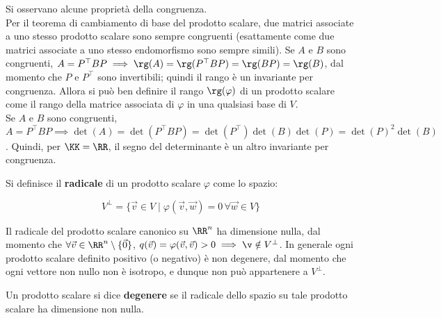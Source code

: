 \documentclass[11pt]{article}
\begin{document}
	\begin{remark}
		Si osservano alcune proprietà della congruenza. \\
		
		\li Per il teorema di cambiamento di base del prodotto scalare, due matrici associate a uno stesso
		prodotto scalare sono sempre congruenti (esattamente come due matrici associate a uno stesso
		endomorfismo sono sempre simili).
		\li Se $A$ e $B$ sono congruenti, $A = P^\top B P \implies \rg(A) = \rg(P^\top B P) = \rg(BP) = \rg(B)$,
		dal momento che $P$ e $P^\top$ sono invertibili; quindi il rango è un invariante per congruenza. Allora
		si può ben definire il rango $\rg(\varphi)$ di un prodotto scalare come il rango della matrice
		associata di $\varphi$ in una qualsiasi base di $V$. \\
		\li Se $A$ e $B$ sono congruenti, $A = P^\top B P \implies \det(A) = \det(P^\top B P) = \det(P^\top) \det(B) \det(P)=
		\det(P)^2 \det(B)$. Quindi, per $\KK = \RR$, il segno del determinante è un altro invariante per congruenza.
	\end{remark}

	\begin{definition}
		Si definisce il \textbf{radicale} di un prodotto scalare $\varphi$ come lo spazio:
		
		\[ V^\perp = \{ \vec{v} \in V \mid \varphi(\vec{v}, \vec{w}) = 0 \, \forall \vec{w} \in V \} \]
		
		\vskip 0.05in
	\end{definition}
	
	\begin{remark}
		Il radicale del prodotto scalare canonico su $\RR^n$ ha dimensione nulla, dal momento che $\forall \vec{v} \in \RR^n \setminus \{\vec{0}\}$, $q(\vec{v}) = \varphi(\vec{v}, \vec{v}) > 0 \implies \v \notin V^\perp$. In
		generale ogni prodotto scalare definito positivo (o negativo) è non degenere, dal momento che ogni vettore
		non nullo non è isotropo, e dunque non può appartenere a $V^\perp$.
	\end{remark}

	\begin{definition}
		Un prodotto scalare si dice \textbf{degenere} se il radicale dello spazio su tale prodotto scalare ha
		dimensione non nulla.
	\end{definition}
	
\end{document}
